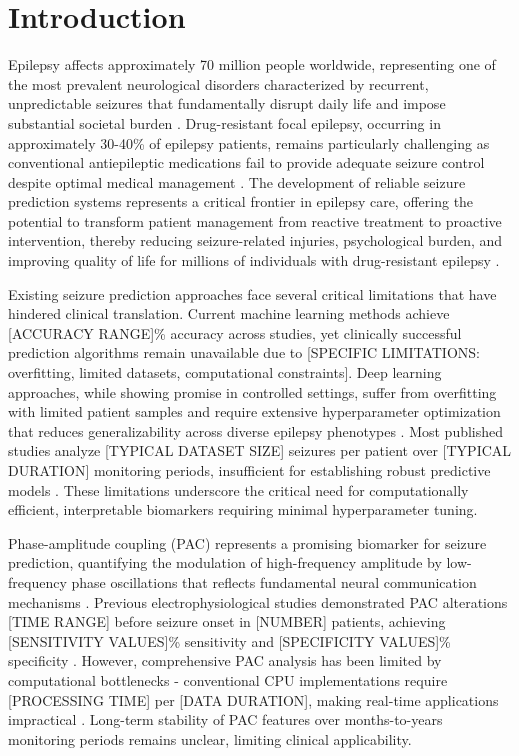 
\section{Introduction}

Epilepsy affects approximately 70 million people worldwide, representing one of the most prevalent neurological disorders characterized by recurrent, unpredictable seizures that fundamentally disrupt daily life and impose substantial societal burden . Drug-resistant focal epilepsy, occurring in approximately 30-40\% of epilepsy patients, remains particularly challenging as conventional antiepileptic medications fail to provide adequate seizure control despite optimal medical management . The development of reliable seizure prediction systems represents a critical frontier in epilepsy care, offering the potential to transform patient management from reactive treatment to proactive intervention, thereby reducing seizure-related injuries, psychological burden, and improving quality of life for millions of individuals with drug-resistant epilepsy .

Existing seizure prediction approaches face several critical limitations that have hindered clinical translation. Current machine learning methods achieve [ACCURACY RANGE]\% accuracy across studies, yet clinically successful prediction algorithms remain unavailable due to [SPECIFIC LIMITATIONS: overfitting, limited datasets, computational constraints]. Deep learning approaches, while showing promise in controlled settings, suffer from overfitting with limited patient samples and require extensive hyperparameter optimization that reduces generalizability across diverse epilepsy phenotypes . Most published studies analyze [TYPICAL DATASET SIZE] seizures per patient over [TYPICAL DURATION] monitoring periods, insufficient for establishing robust predictive models . These limitations underscore the critical need for computationally efficient, interpretable biomarkers requiring minimal hyperparameter tuning.

Phase-amplitude coupling (PAC) represents a promising biomarker for seizure prediction, quantifying the modulation of high-frequency amplitude by low-frequency phase oscillations that reflects fundamental neural communication mechanisms . Previous electrophysiological studies demonstrated PAC alterations [TIME RANGE] before seizure onset in [NUMBER] patients, achieving [SENSITIVITY VALUES]\% sensitivity and [SPECIFICITY VALUES]\% specificity . However, comprehensive PAC analysis has been limited by computational bottlenecks - conventional CPU implementations require [PROCESSING TIME] per [DATA DURATION], making real-time applications impractical . Long-term stability of PAC features over months-to-years monitoring periods remains unclear, limiting clinical applicability.

